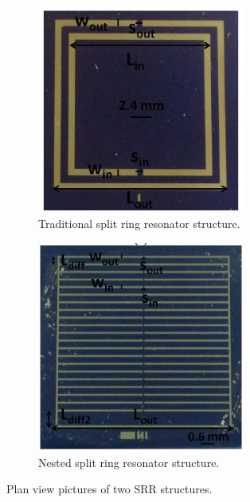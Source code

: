 \documentclass[11pt,a4paper]{article}
\begin{document}
\begin{figure}[h]
\centering
\begin{subfigure}{.5\textwidth}
  \centering
\includegraphics[width=0.75\textwidth]{srr.JPG}
\caption{Traditional split ring resonator structure.\label{fig:srr}}
\end{subfigure}%
\begin{subfigure}{.5\textwidth}
  \centering
\includegraphics[width=0.75\textwidth]{nested.JPG}
\caption{Nested split ring resonator structure.\label{fig:nested}}
\end{subfigure}
\caption{Plan view pictures of two SRR structures. \cite{srr}}
\end{figure}
\end{document}
